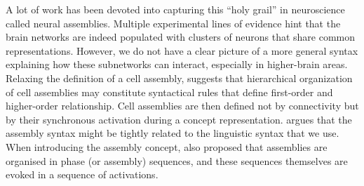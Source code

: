     A lot of work has been devoted into capturing this ``holy grail'' in
    neuroscience called neural assemblies. Multiple experimental lines of
    evidence hint that the brain networks are indeed populated with clusters of
    neurons that share common representations. However, we do not have a clear
    picture of a more general syntax explaining how these subnetworks can
    interact, especially in higher-brain areas. Relaxing the definition of a
    cell assembly, \cite{Buzsaki2010} suggests that hierarchical organization
    of cell assemblies may constitute syntactical rules that define first-order
    and higher-order relationship. Cell assemblies are then defined not by
    connectivity but by their synchronous activation during a concept
    representation. \cite{Pulvermuller2010} argues that the assembly syntax
    might be tightly related to the linguistic syntax that we use. When
    introducing the assembly concept, \cite{Hebb49} also proposed that
    assemblies are organised in phase (or assembly) sequences, and these
    sequences themselves are evoked in a sequence of activations.


 

  





